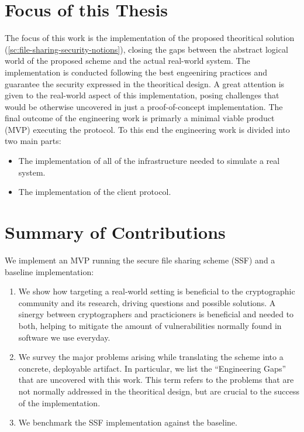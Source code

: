 \section{Focus of this Thesis}\label{sc:focus-of-this-thesis}

The focus of this work is the implementation of the proposed theoritical solution (\cref{sc:file-sharing-security-notions}),
closing the gaps between the abstract logical world of the proposed scheme
and the actual real-world system.
The implementation is conducted following the best engeeniring practices 
and guarantee the security expressed in the theoritical design.
A great attention is given to the real-world aspect of this implementation,
posing challenges that would be otherwise uncovered in just a proof-of-concept implementation.
The final outcome of the engineering work is primarly a minimal viable product (MVP) executing the protocol.
To this end the engineering work is divided into two main parts:
\begin{itemize}
    \item The implementation of all of the infrastructure needed to simulate a real system.
    \item The implementation of the client protocol.
\end{itemize}

\section{Summary of Contributions}

We implement an MVP running the secure file sharing scheme (SSF) and a baseline implementation:

\begin{enumerate}
    \item We show how targeting a real-world setting is beneficial to the cryptographic community and its research, driving questions and possible solutions. A sinergy between cryptographers and practicioners is beneficial and needed to both, helping to mitigate the amount of vulnerabilities normally found in software we use everyday.
    \item We survey the major problems arising while translating the scheme into a concrete, deployable artifact. In particular, we list the ``Engineering Gaps'' that are uncovered with this work. This term refers to the problems that are not normally addressed in the theoritical design, but are crucial to the success of the implementation.
    \item We benchmark the SSF implementation against the baseline.
\end{enumerate}

